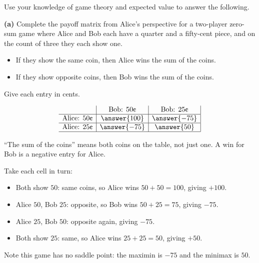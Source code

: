 \documentclass[12pt]{ximera}
\begin{document}
\begin{problem}
Use your knowledge of game theory and expected value to answer the following.

\begin{prompt}
\textbf{(a)} Complete the payoff matrix from Alice's perspective for a two-player
zero-sum game where Alice and Bob each have a quarter and a fifty-cent piece, and on
the count of three they each show one.
\begin{itemize}
\item If they show the same coin, then Alice wins the sum of the coins.
\item If they show opposite coins, then Bob wins the sum of the coins.
\end{itemize}

Give each entry in cents.

\[
\begin{array}{c|c|c|}
\phantom{|} & \text{Bob: }50\text{\textcent} & \text{Bob: }25\text{\textcent} \\\hline
\text{Alice: }50\text{\textcent} & \answer{100} & \answer{-75} \\\hline
\text{Alice: }25\text{\textcent} & \answer{-75} & \answer{50} \\\hline
\end{array}
\]

\begin{hint}
``The sum of the coins'' means both coins on the table, not just one. A win for Bob
is a negative entry for Alice.
\end{hint}

\begin{feedback}
Take each cell in turn:
\begin{itemize}
\item Both show $50$\textcent: same coins, so Alice wins $50+50=100$\textcent, giving $+100$.
\item Alice $50$\textcent, Bob $25$\textcent: opposite, so Bob wins $50+25=75$\textcent, giving $-75$.
\item Alice $25$\textcent, Bob $50$\textcent: opposite again, giving $-75$.
\item Both show $25$\textcent: same, so Alice wins $25+25=50$\textcent, giving $+50$.
\end{itemize}

Note this game has no saddle point: the maximin is $-75$ and the minimax is $50$.
\end{feedback}
\end{prompt}


\end{problem}
\end{document}
